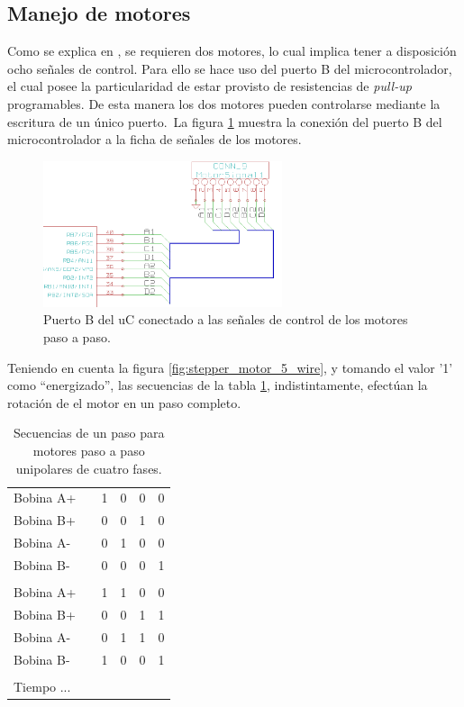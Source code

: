 \subsection{Manejo de motores}
Como se explica en , se requieren dos motores, lo
cual implica tener a disposici\'on ocho se\~nales de control. Para ello se hace
uso del puerto B del microcontrolador, el cual posee la particularidad de estar
provisto de resistencias de \emph{pull-up} programables. De esta manera los
dos motores pueden controlarse mediante la escritura de un \'unico puerto.\
La figura \ref{fig:uc_portb_motors} muestra la conexi\'on del puerto B del
microcontrolador a la ficha de se\~nales de los motores.


\begin{figure}[htp]
\centering
\includegraphics[width=7cm]{./img/uc_portb_motors.png}
\caption{Puerto B del uC conectado a las se\~nales de control de los motores
paso a paso.}
\label{fig:uc_portb_motors}
\end{figure}


Teniendo en cuenta la figura \ref{fig:stepper_motor_5_wire}, y tomando el
valor '1' como ``energizado'', las secuencias de la tabla
\ref{tab:seq_motors_1}, indistintamente, efect\'uan la rotaci\'on de el motor
en
un paso completo.

\begin{table}[htp]
\centering
\begin{tabular}{l c|c|c|c|c|}
Bobina A+ & & 1 & 0 & 0 & 0 \\	
Bobina B+ & & 0 & 0 & 1 & 0 \\
Bobina A- &	& 0 & 1 & 0 & 0 \\
Bobina B- &	& 0 & 0 & 0 & 1 \\
							\\
Bobina A+ & & 1 & 1 & 0 & 0 \\
Bobina B+ &	& 0 & 0 & 1 & 1 \\
Bobina A- &	& 0 & 1 & 1 & 0 \\ 
Bobina B- &	& 1 & 0 & 0 & 1 \\
							\\
Tiempo	...					\\
\end{tabular}
\caption{Secuencias de un paso para motores paso a paso unipolares de cuatro
fases.}
\label{tab:seq_motors_1}
\end{table}

